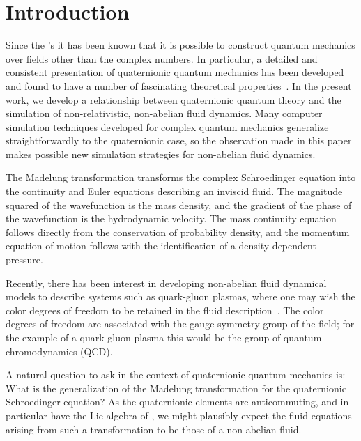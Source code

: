 \documentclass[a4paper,aps,prd,preprint,groupedaddress]{revtex4}
\begin{document}
\section{Introduction}

Since the \coordHE{}'s it has been known that it is possible to construct quantum mechanics over fields other than the complex numbers. In particular, a detailed and consistent presentation of quaternionic quantum mechanics has been developed and found to have a number of fascinating theoretical properties~\cite{bib:adlerbook}. In the present work, we develop a relationship between quaternionic quantum theory and the simulation of non-relativistic, non-abelian fluid dynamics. Many computer simulation techniques developed for complex quantum mechanics generalize straightforwardly to the quaternionic case, so the observation made in this paper makes possible new simulation strategies for non-abelian fluid dynamics.

The Madelung transformation transforms the complex Schroedinger equation into the continuity and Euler equations describing an inviscid fluid. The magnitude squared of the wavefunction is the mass density, and the gradient of the phase of the wavefunction is the hydrodynamic velocity. The mass continuity equation follows directly from the conservation of probability density, and the momentum equation of motion follows with the identification of a density dependent pressure.

Recently, there has been interest in developing non-abelian fluid dynamical models to describe systems such as quark-gluon plasmas, where one may wish the color degrees of freedom to be retained in the fluid description~\cite{bib:jackiw1,bib:jackiw2,bib:jackiw3}. The color degrees of freedom are associated with the gauge symmetry group of the field; for the example of a quark-gluon plasma this would be the group \coordHE{} of quantum chromodynamics (QCD). 

A natural question to ask in the context of quaternionic quantum mechanics is: What is the generalization of the Madelung transformation for the quaternionic Schroedinger equation?  As the quaternionic elements are anticommuting, and in particular have the Lie algebra of \coordHE{}, we might plausibly expect the fluid equations arising from such a transformation to be those of a non-abelian fluid.
\end{document}
